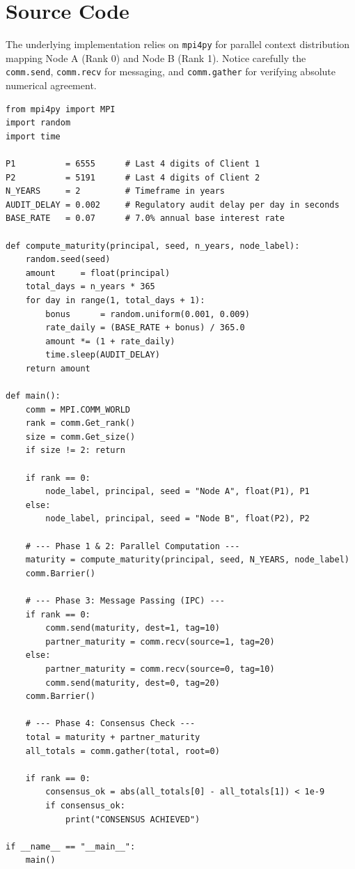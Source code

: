 \documentclass[11pt]{article}
\begin{document}
\section{Source Code}

The underlying implementation relies on \texttt{mpi4py} for parallel context distribution mapping Node A (Rank 0) and Node B (Rank 1). Notice carefully the \texttt{comm.send}, \texttt{comm.recv} for messaging, and \texttt{comm.gather} for verifying absolute numerical agreement.

\begin{codebox}
\begin{lstlisting}
from mpi4py import MPI
import random
import time

P1          = 6555      # Last 4 digits of Client 1 
P2          = 5191      # Last 4 digits of Client 2 
N_YEARS     = 2         # Timeframe in years
AUDIT_DELAY = 0.002     # Regulatory audit delay per day in seconds
BASE_RATE   = 0.07      # 7.0% annual base interest rate

def compute_maturity(principal, seed, n_years, node_label):
    random.seed(seed)
    amount     = float(principal)
    total_days = n_years * 365
    for day in range(1, total_days + 1):
        bonus      = random.uniform(0.001, 0.009)
        rate_daily = (BASE_RATE + bonus) / 365.0
        amount *= (1 + rate_daily)
        time.sleep(AUDIT_DELAY)
    return amount

def main():
    comm = MPI.COMM_WORLD
    rank = comm.Get_rank()
    size = comm.Get_size()
    if size != 2: return
    
    if rank == 0:
        node_label, principal, seed = "Node A", float(P1), P1
    else:
        node_label, principal, seed = "Node B", float(P2), P2

    # --- Phase 1 & 2: Parallel Computation ---
    maturity = compute_maturity(principal, seed, N_YEARS, node_label)
    comm.Barrier()

    # --- Phase 3: Message Passing (IPC) ---
    if rank == 0:
        comm.send(maturity, dest=1, tag=10)
        partner_maturity = comm.recv(source=1, tag=20)
    else:
        partner_maturity = comm.recv(source=0, tag=10)
        comm.send(maturity, dest=0, tag=20)
    comm.Barrier()

    # --- Phase 4: Consensus Check ---
    total = maturity + partner_maturity
    all_totals = comm.gather(total, root=0)
    
    if rank == 0:
        consensus_ok = abs(all_totals[0] - all_totals[1]) < 1e-9
        if consensus_ok:
            print("CONSENSUS ACHIEVED")

if __name__ == "__main__":
    main()
\end{lstlisting}
\end{codebox}
\end{document}
